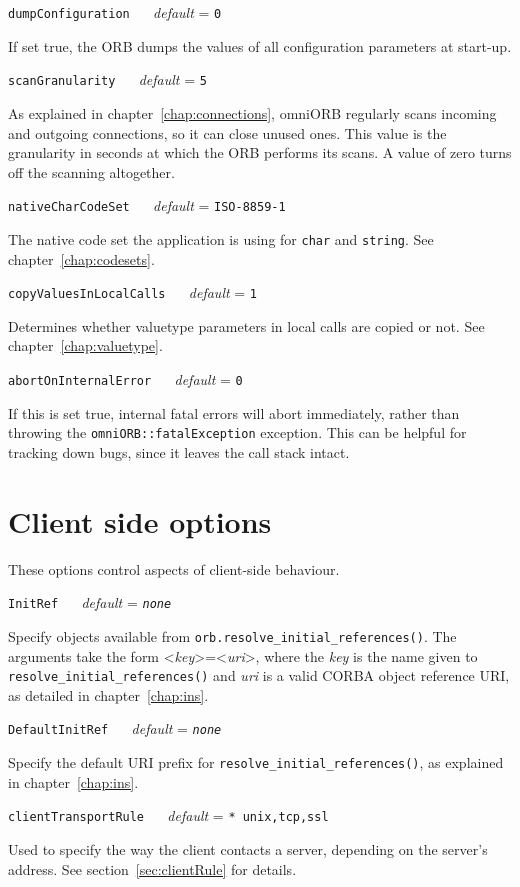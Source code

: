 \documentclass[draft,11pt,twoside,a4paper]{book}
\makeatletter
\newcommand{\type}[1]{\texttt{#1}}
\newcommand{\code}[1]{\texttt{#1}}
\newcommand{\op}[1]{\texttt{#1()}}
\newcommand{\confopt}[2]
  {\vspace{\baselineskip}\par\noindent\code{#1} ~~ \textit{default} =
   \code{#2}\\[-1ex]\@afterheading}
\newcommand{\dsc}{\discretionary{}{}{}}
\makeatother
\begin{document}
\confopt{dumpConfiguration}{0}

If set true, the ORB dumps the values of all configuration parameters
at start-up.


\confopt{scanGranularity}{5}

As explained in chapter~\ref{chap:connections}, omniORB regularly
scans incoming and outgoing connections, so it can close unused
ones. This value is the granularity in seconds at which the ORB
performs its scans. A value of zero turns off the scanning altogether.


\confopt{nativeCharCodeSet}{ISO-8859-1}

The native code set the application is using for \type{char} and
\type{string}. See chapter~\ref{chap:codesets}.


\confopt{copyValuesInLocalCalls}{1}

Determines whether valuetype parameters in local calls are copied or
not. See chapter~\ref{chap:valuetype}.


\confopt{abortOnInternalError}{0}

If this is set true, internal fatal errors will abort immediately,
rather than throwing the \type{omniORB::fatalException} exception.
This can be helpful for tracking down bugs, since it leaves the call
stack intact.


\section{Client side options}

These options control aspects of client-side behaviour.


\confopt{InitRef}{\textit{none}}

Specify objects available from
\op{orb.resolve\_initial\_references}. The arguments take the form
<\textit{key}>=<\textit{uri}>, where the \textit{key} is the name
given to \op{resolve\_\dsc{}initial\_\dsc{}references} and
\textit{uri} is a valid CORBA object reference URI, as detailed in
chapter~\ref{chap:ins}.


\confopt{DefaultInitRef}{\textit{none}}

Specify the default URI prefix for
\op{resolve\_\dsc{}initial\_\dsc{}references}, as explained in
chapter~\ref{chap:ins}.


\confopt{clientTransportRule}{* unix,tcp,ssl}

Used to specify the way the client contacts a server, depending on the
server's address. See section~\ref{sec:clientRule} for details.
\end{document}
